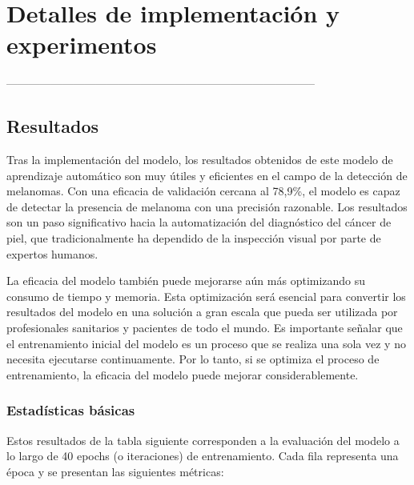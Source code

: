 \chapter{Detalles de implementación y experimentos}\label{chapter:implementation}

-----------------------------------------------------------------------------------
\section{Resultados}\label{sec:results}
Tras la implementación del modelo, los resultados obtenidos de este modelo de aprendizaje automático son muy útiles y eficientes en el campo de la detección de melanomas. Con una eficacia de validación cercana al 78,9\%, el modelo es capaz de detectar la presencia de melanoma con una precisión razonable. Los resultados son un paso significativo hacia la automatización del diagnóstico del cáncer de piel, que tradicionalmente ha dependido de la inspección visual por parte de expertos humanos.

La eficacia del modelo también puede mejorarse aún más optimizando su consumo de tiempo y memoria. Esta optimización será esencial para convertir los resultados del modelo en una solución a gran escala que pueda ser utilizada por profesionales sanitarios y pacientes de todo el mundo. Es importante señalar que el entrenamiento inicial del modelo es un proceso que se realiza una sola vez y no necesita ejecutarse continuamente. Por lo tanto, si se optimiza el proceso de entrenamiento, la eficacia del modelo puede mejorar considerablemente.

	\subsection{Estadísticas básicas}\label{sub:basic_statistics}
    
    Estos resultados de la tabla siguiente corresponden a la evaluación del modelo a lo largo de 40 epochs (o iteraciones) de entrenamiento. Cada fila representa una época y se presentan las siguientes métricas:
    
